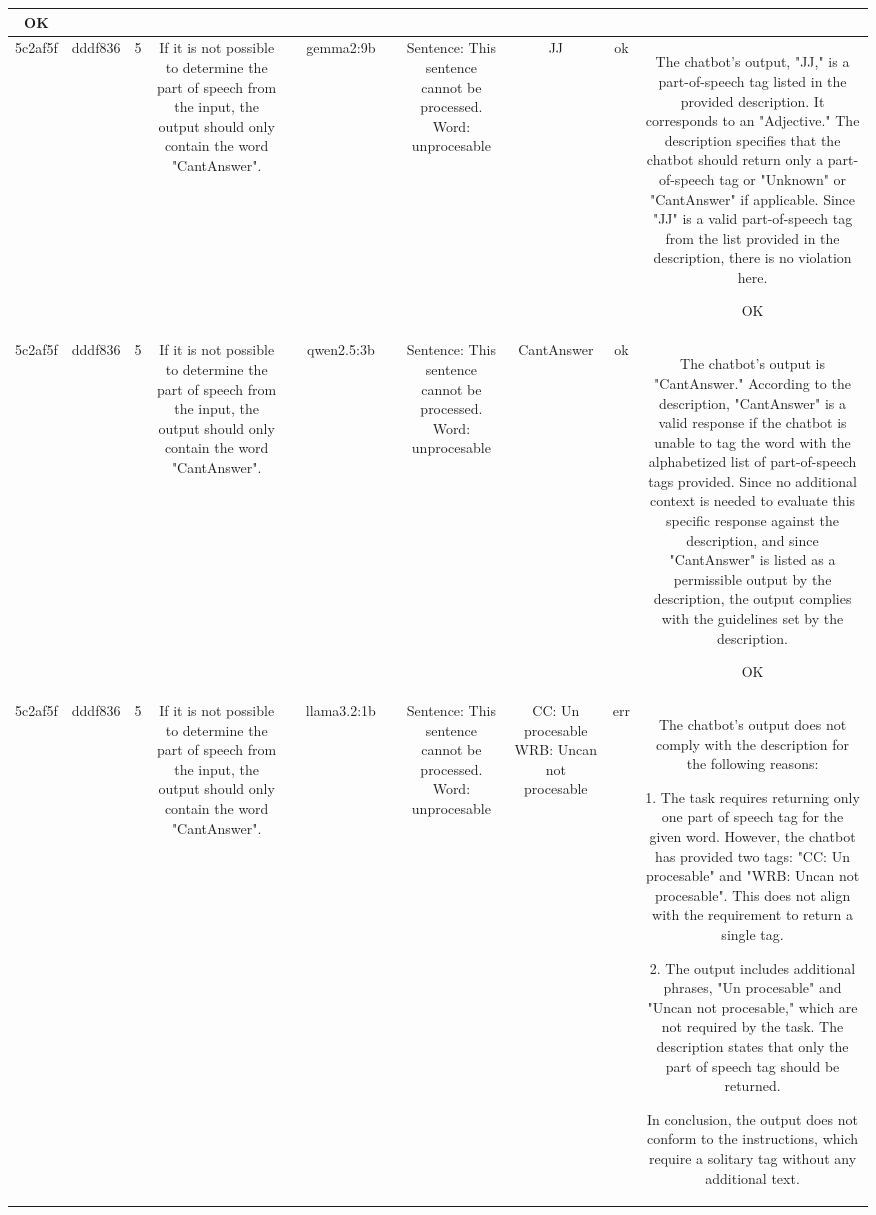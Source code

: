 \begin{table}[h!]
\begin{tabular}{|c|c|c|c|c|c|c|c|c|c|c|}
OK\\
\hline
5c2af5f & dddf836 & 5 & If it is not possible to determine the part of speech from the input, the output should only contain the word "CantAnswer". &  & gemma2:9b &  & Sentence: This sentence cannot be processed. Word: unprocesable & JJ  
 & ok & The chatbot's output, "JJ," is a part-of-speech tag listed in the provided description. It corresponds to an "Adjective." The description specifies that the chatbot should return only a part-of-speech tag or "Unknown" or "CantAnswer" if applicable. Since "JJ" is a valid part-of-speech tag from the list provided in the description, there is no violation here. 

OK\\
\hline
5c2af5f & dddf836 & 5 & If it is not possible to determine the part of speech from the input, the output should only contain the word "CantAnswer". &  & qwen2.5:3b &  & Sentence: This sentence cannot be processed. Word: unprocesable & CantAnswer & ok & The chatbot's output is "CantAnswer." According to the description, "CantAnswer" is a valid response if the chatbot is unable to tag the word with the alphabetized list of part-of-speech tags provided. Since no additional context is needed to evaluate this specific response against the description, and since "CantAnswer" is listed as a permissible output by the description, the output complies with the guidelines set by the description.

OK\\
\hline
5c2af5f & dddf836 & 5 & If it is not possible to determine the part of speech from the input, the output should only contain the word "CantAnswer". &  & llama3.2:1b &  & Sentence: This sentence cannot be processed. Word: unprocesable & CC: Un procesable 
WRB: Uncan not procesable & err & The chatbot's output does not comply with the description for the following reasons:

1. The task requires returning only one part of speech tag for the given word. However, the chatbot has provided two tags: "CC: Un procesable" and "WRB: Uncan not procesable". This does not align with the requirement to return a single tag.

2. The output includes additional phrases, "Un procesable" and "Uncan not procesable," which are not required by the task. The description states that only the part of speech tag should be returned.

In conclusion, the output does not conform to the instructions, which require a solitary tag without any additional text.


\end{tabular}
\end{table}
